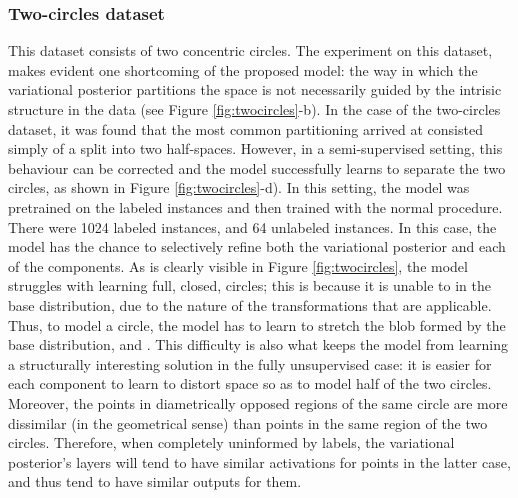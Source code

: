 \subsubsection{Two-circles dataset}
This dataset consists of two concentric circles. The experiment on this dataset,
makes evident one shortcoming of the proposed model: the way in which the variational
posterior partitions the space is not necessarily guided by the intrisic structure
in the data (see Figure \ref{fig:twocircles}-b). In the case of the two-circles
dataset, it was found that the most common partitioning arrived at consisted
simply of a split into two half-spaces. However, in a semi-supervised setting,
this behaviour can be corrected and the model successfully learns to separate the
two circles, as shown in Figure \ref{fig:twocircles}-d). In this setting, the
model was pretrained on the labeled instances and then trained with the normal procedure.
There were 1024 labeled instances, and 64 unlabeled instances.
In this case, the model has the chance to selectively refine both the variational
posterior and each of the components. As is clearly visible in Figure
\ref{fig:twocircles}, the model struggles with learning full, closed, circles;
this is because it is unable to  in the base distribution, due
to the nature of the transformations that are applicable. Thus, to model a circle,
the model has to learn to stretch the blob formed by the base distribution, and
. This difficulty is also what keeps the model from learning
a structurally interesting solution in the fully unsupervised case: it is easier
for each component to learn to distort space so as to model half of the two circles.
Moreover, the points in diametrically opposed regions of the same circle are
more dissimilar (in the geometrical sense) than points in the same region of the
two circles. Therefore, when completely uninformed by labels, the variational
posterior's layers will tend to have similar activations for points in the latter
case, and thus tend to have similar outputs for them.

